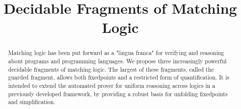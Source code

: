 \documentclass[sigplan,review,screen]{acmart}
\begin{document}
\title{Decidable Fragments of Matching Logic}
\begin{abstract}
    Matching logic has been put forward as a "lingua franca"
    for verifying and reasoning about programs and programming languages.
    We propose three increasingly powerful decidable fragments of matching logic.
    The largest of these fragments, called the guarded fragment,
    allows both fixedpoints and a restricted form of quantification.
    It is intended to extend the automated prover for uniform reasoning across
    logics in a previously developed framework,
    by providing a robust basis for unfolding fixedpoints and simplification.
\end{abstract}

\maketitle









\end{document}
